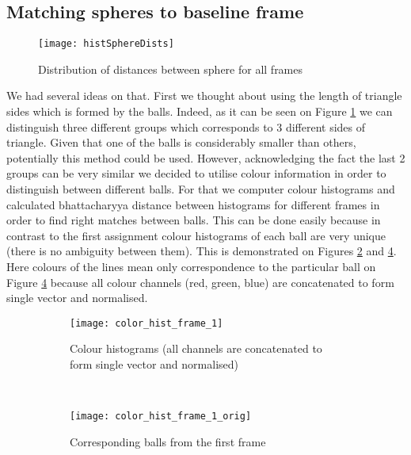 \documentclass[a4paper,11pt]{article}
\theoremstyle{mytheor}
\begin{document}
\subsection{Matching spheres to baseline frame}

\begin{figure}[htbp!]
    \centering
    \texttt{[image: histSphereDists]}
    \caption{Distribution of distances between sphere for all frames}
    \label{fig:histSphereDists}
\end{figure}

We had several ideas on that. First we thought about using the length of triangle sides which is formed by the balls. Indeed, as it can be seen on Figure \ref{fig:histSphereDists} we can distinguish three different groups which corresponds to 3 different sides of triangle. Given that one of the balls is considerably smaller than others, potentially this method could be used. However, acknowledging the fact the last 2 groups can be very similar we decided to utilise colour information in order to distinguish between different balls. 
For that we computer colour histograms and calculated bhattacharyya distance between histograms for different frames in order to find right matches between balls. This can be done easily because in contrast to the first assignment colour histograms of each ball are very unique (there is no ambiguity between them). This is demonstrated on
Figures \ref{fig:color_hist_frame_1} and \ref{fig:color_hist_frame_1_orig}. Here colours of the lines mean only correspondence to the particular ball on Figure \ref{fig:color_hist_frame_1_orig} because all colour channels (red, green, blue) are concatenated to form single vector and normalised.

\begin{figure}[htbp!]
    \centering
    \begin{subfigure}[t]{0.85\textwidth}
        \centering
        \texttt{[image: color\_hist\_frame\_1]}
        \caption{Colour histograms (all channels are concatenated to form single vector and normalised)}
        \label{fig:color_hist_frame_1}
    \end{subfigure}%
    \\
    \centering
    \begin{subfigure}[t]{0.85\textwidth}
        \centering
        \texttt{[image: color\_hist\_frame\_1\_orig]}
        \caption{Corresponding balls from the first frame}
        \label{fig:color_hist_frame_1_orig}
    \end{subfigure}
    
    \caption{}
\end{figure}
\end{document}
